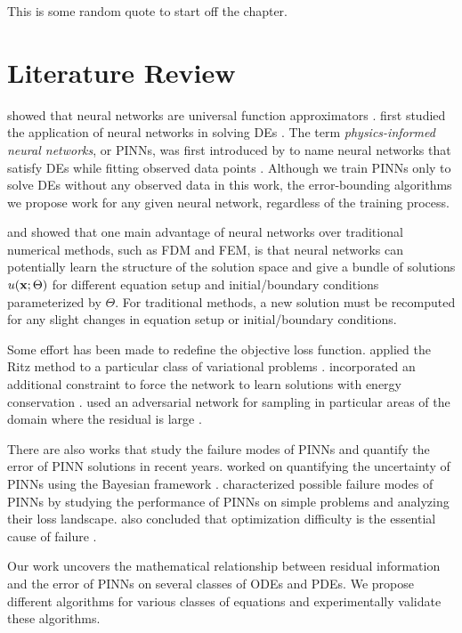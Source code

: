 \begin{savequote}[75mm]
This is some random quote to start off the chapter.
\end{savequote}

\chapter{Literature Review} \label{chapter:literature-review}
    \citeauthor{hornik1989multilayer} showed that neural networks are universal function approximators \cite{hornik1989multilayer}. 
    \citeauthor{lagaris1998artificial} first studied the application of neural networks in solving DEs \cite{lagaris1998artificial}.
    The term \textit{physics-informed neural networks}, or PINNs, was first introduced by \citeauthor{raissi2019physics} to name neural networks that satisfy DEs while fitting observed data points \cite{raissi2019physics}. 
    Although we train PINNs only to solve DEs without any observed data in this work, the error-bounding algorithms we propose work for any given neural network, regardless of the training process.

    \citeauthor{flamant2020solving} and \citeauthor{DesaiShaan2021OTLo} showed that one main advantage of neural networks over traditional numerical methods, such as FDM and FEM, is that neural networks can potentially learn the structure of the solution space and give a bundle of solutions $u(\mathbf{x}; \Theta)$ for different equation setup and initial/boundary conditions parameterized by $\Theta$.
    For traditional methods, a new solution must be recomputed for any slight changes in equation setup or initial/boundary conditions.

    Some effort has been made to redefine the objective loss function. 
    \citeauthor{yu2017deep} applied the Ritz method to a particular class of variational problems \cite{yu2017deep}.
    \citeauthor{mattheakis2020hamiltonian} incorporated an additional constraint to force the network to learn solutions with energy conservation \cite{mattheakis2020hamiltonian}.
    \citeauthor{parwani2021adversarial} used an adversarial network for sampling in particular areas of the domain where the residual is large \cite{parwani2021adversarial}.

    There are also works that study the failure modes of PINNs and quantify the error of PINN solutions in recent years. 
    \citeauthor{graf2021uncertainty} worked on quantifying the uncertainty of PINNs using the Bayesian framework \cite{graf2021uncertainty}.
    \citeauthor{krishnapriyan2021characterizing} characterized possible failure modes of PINNs by studying the performance of PINNs on simple problems and analyzing their loss landscape. 
    \citeauthor{krishnapriyan2021characterizing} also concluded that optimization difficulty is the essential cause of failure \cite{krishnapriyan2021characterizing}.

    Our work uncovers the mathematical relationship between residual information and the error of PINNs on several classes of ODEs and PDEs. 
    We propose different algorithms for various classes of equations and experimentally validate these algorithms.
